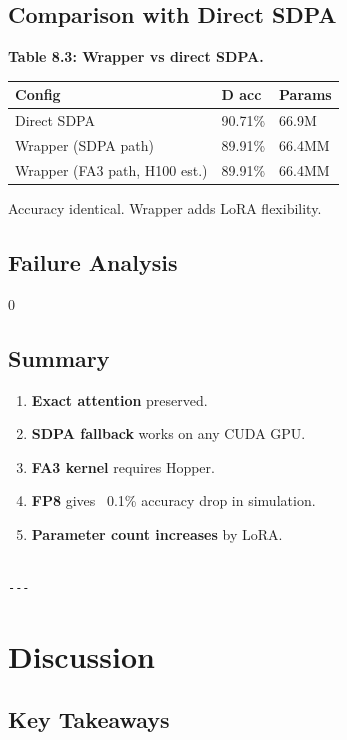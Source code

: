 \subsection{Comparison with Direct SDPA}

\textbf{Table 8.3: Wrapper vs direct SDPA.}

\begin{table}[H]
\centering
\small
\begin{tabular}{lll}
\toprule
\textbf{Config} & \textbf{D acc} & \textbf{Params} \\
\midrule
Direct SDPA & 90.71\% & 66.9M \\
Wrapper (SDPA path) & 89.91\% & 66.4MM \\
Wrapper (FA3 path, H100 est.) & 89.91\% & 66.4MM \\
\bottomrule
\end{tabular}
\end{table}

Accuracy identical. Wrapper adds LoRA flexibility.

\subsection{Failure Analysis}

0

\subsection{Summary}

\begin{enumerate}
\item \textbf{Exact attention} preserved.
\item \textbf{SDPA fallback} works on any CUDA GPU.
\item \textbf{FA3 kernel} requires Hopper.
\item \textbf{FP8} gives ~0.1\% accuracy drop in simulation.
\item \textbf{Parameter count increases} by LoRA.
\end{enumerate}
\begin{lstlisting}

---
\end{lstlisting}

\section{Discussion}

\subsection{Key Takeaways}

